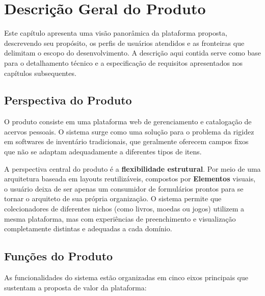 \chapter{Descrição Geral do Produto}
\label{cap:04}

Este capítulo apresenta uma visão panorâmica da plataforma proposta, descrevendo seu propósito, os perfis de usuários atendidos e as fronteiras que delimitam o escopo do desenvolvimento. A descrição aqui contida serve como base para o detalhamento técnico e a especificação de requisitos apresentados nos capítulos subsequentes.

\section{Perspectiva do Produto}

O produto consiste em uma plataforma web de gerenciamento e catalogação de acervos pessoais. O sistema surge como uma solução para o problema da rigidez em softwares de inventário tradicionais, que geralmente oferecem campos fixos que não se adaptam adequadamente a diferentes tipos de itens.

A perspectiva central do produto é a \textbf{flexibilidade estrutural}. Por meio de uma arquitetura baseada em layouts reutilizáveis, compostos por \textbf{Elementos} visuais, o usuário deixa de ser apenas um consumidor de formulários prontos para se tornar o arquiteto de sua própria organização.
O sistema permite que colecionadores de diferentes nichos (como livros, moedas ou jogos) utilizem a mesma plataforma, mas com experiências de preenchimento e visualização completamente distintas e adequadas a cada domínio.

\section{Funções do Produto}

As funcionalidades do sistema estão organizadas em cinco eixos principais que sustentam a proposta de valor da plataforma:

